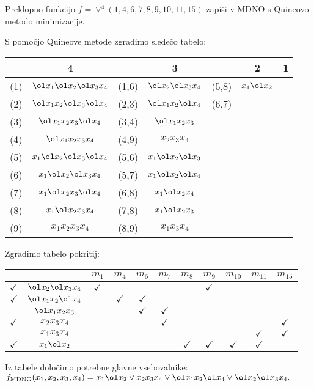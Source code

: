 \begin{zgled}
\label{MDNO}
Preklopno funkcijo
$
f = \vee^4(1,4,6,7,8,9,10,11,15)
$
zapiši v MDNO s Quineovo metodo minimizacije.
\end{zgled}
\begin{resitev}

S pomočjo Quineove metode zgradimo sledečo tabelo:

\begin{tabular}{cc|cc|cc|c}
& 4 & & 3 & & 2 & 1 \\
\hline
(1) & \sout{$\ol x_1 \ol x_2 \ol x_3 x_4$} & (1,6) & $\ol x_2 \ol x_3 x_4$ & (5,8) & $x_1 \ol x_2$ \\
(2) & \sout{$\ol x_1 x_2 \ol x_3 \ol x_4$} & (2,3) & $\ol x_1 x_2 \ol x_4$ & (6,7) & \\
(3) & \sout{$\ol x_1 x_2 x_3 \ol x_4$} & (3,4) & $\ol x_1 x_2 x_3$ & & \\
(4) & \sout{$\ol x_1 x_2 x_3 x_4$} & (4,9) & $x_2 x_3 x_4$ & & \\
(5) & \sout{$x_1 \ol x_2 \ol x_3 \ol x_4$} & (5,6) & \sout{$x_1 \ol x_2 \ol x_3$} & & \\
(6) & \sout{$x_1 \ol x_2 \ol x_3 x_4$} & (5,7) & \sout{$x_1 \ol x_2 \ol x_4$} & & \\
(7) & \sout{$x_1 \ol x_2 x_3 \ol x_4$} & (6,8) & \sout{$x_1 \ol x_2 x_4$} & & \\
(8) & \sout{$x_1 \ol x_2 x_3 x_4$} & (7,8) & \sout{$x_1 \ol x_2 x_3$} & & \\
(9) & \sout{$x_1 x_2 x_3 x_4$} & (8,9) & $x_1 x_3 x_4$ & & &
\end{tabular}

\bigskip
Zgradimo tabelo pokritij:


\begin{tabular}{cc|ccccccccc}
& & $m_1$ & $m_4$ & $m_6$ & $m_7$ & $m_8$ & $m_9$ & $m_{10}$ & $m_{11}$ & $m_{15}$ \\
\hline
$\checkmark$ & $\ol x_2 \ol x_3 x_4$ & $\checkmark$ & & & & & $\checkmark$ & & & \\
\hline
$\checkmark$ & $\ol x_1 x_2 \ol x_4$ & & $\checkmark$ & $\checkmark$ & & & & & & \\
\hline
& $\ol x_1 x_2 x_3$ & & & $\checkmark$ & $\checkmark$ & & & & & \\
\hline
$\checkmark$ & $x_2 x_3 x_4$ & & & & $\checkmark$ & & & & & $\checkmark$ \\
\hline
& $x_1 x_3 x_4$ & & & & & & & & $\checkmark$ & $\checkmark$ \\
\hline
$\checkmark$ & $x_1 \ol x_2$ & & & & & $\checkmark$ & $\checkmark$ & $\checkmark$ & $\checkmark$ & \\
\hline
\end{tabular}

\bigskip
Iz tabele določimo potrebne glavne vsebovalnike:
\bigskip
$f_{\text{MDNO}}(x_1,x_2,x_3,x_4) = x_1 \ol x_2 \vee x_2 x_3 x_4 \vee \ol x_1 x_2 \ol x_4 \vee \ol x_2 \ol x_3  x_4.$
\end{resitev}

